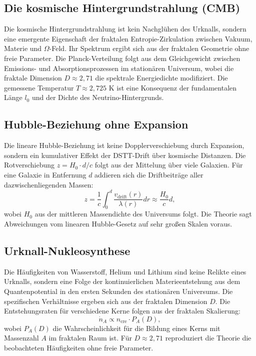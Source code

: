 \documentclass[12pt,a4paper]{article}
\begin{document}
\subsection{Die kosmische Hintergrundstrahlung (CMB)}
Die kosmische Hintergrundstrahlung ist kein Nachglühen des Urknalls, sondern eine emergente Eigenschaft der fraktalen Entropie-Zirkulation zwischen Vakuum, Materie und $\Omega$-Feld. Ihr Spektrum ergibt sich aus der fraktalen Geometrie ohne freie Parameter. Die Planck-Verteilung folgt aus dem Gleichgewicht zwischen Emissions- und Absorptionsprozessen im stationären Universum, wobei die fraktale Dimension $D \approx 2,71$ die spektrale Energiedichte modifiziert. Die gemessene Temperatur $T \approx 2,725$ K ist eine Konsequenz der fundamentalen Länge $l_0$ und der Dichte des Neutrino-Hintergrunds.

\subsection{Hubble-Beziehung ohne Expansion}
Die lineare Hubble-Beziehung ist keine Dopplerverschiebung durch Expansion, sondern ein kumulativer Effekt der DSTT-Drift über kosmische Distanzen. Die Rotverschiebung $z = H_0 \cdot d/c$ folgt aus der Mittelung über viele Galaxien. Für eine Galaxie in Entfernung $d$ addieren sich die Driftbeiträge aller dazwischenliegenden Massen:
\begin{equation}
z = \frac{1}{c} \int_0^d \frac{v_{\text{drift}}(r)}{\lambda(r)} dr \approx \frac{H_0}{c} d,
\end{equation}
wobei $H_0$ aus der mittleren Massendichte des Universums folgt. Die Theorie sagt Abweichungen vom linearen Hubble-Gesetz auf sehr großen Skalen voraus.

\subsection{Urknall-Nukleosynthese}
Die Häufigkeiten von Wasserstoff, Helium und Lithium sind keine Relikte eines Urknalls, sondern eine Folge der kontinuierlichen Materieentstehung aus dem Quantenpotential in den ersten Sekunden des stationären Universums. Die spezifischen Verhältnisse ergeben sich aus der fraktalen Dimension $D$. Die Entstehungsraten für verschiedene Kerne folgen aus der fraktalen Skalierung:
\begin{equation}
\dot{n}_A \propto n_{\text{cre}} \cdot P_A(D),
\end{equation}
wobei $P_A(D)$ die Wahrscheinlichkeit für die Bildung eines Kerns mit Massenzahl $A$ im fraktalen Raum ist. Für $D \approx 2,71$ reproduziert die Theorie die beobachteten Häufigkeiten ohne freie Parameter.
\end{document}
